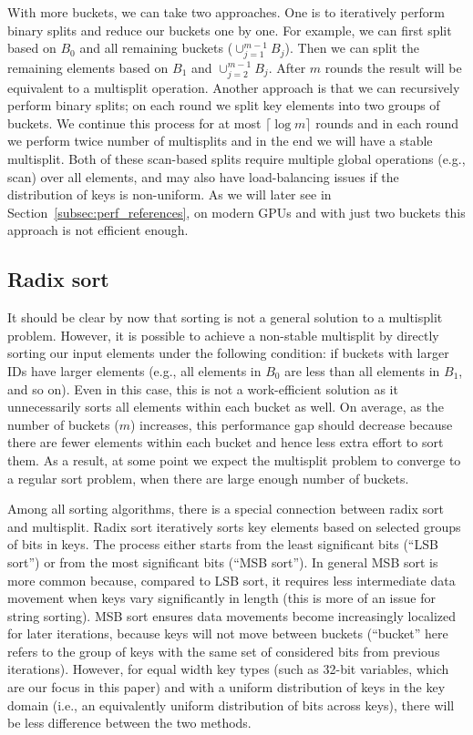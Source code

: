 With more buckets, we can take two approaches.
One is to iteratively perform binary splits and reduce our buckets one by one. For example, we can first split based on $B_0$ and all remaining buckets ($\cup_{j=1}^{m-1} B_j$). Then we can split the remaining elements based on $B_1$ and $\cup_{j=2}^{m-1} B_j$. After $m$ rounds the result will be equivalent to a multisplit operation.
Another approach is that we can recursively perform binary splits; on each round we split key elements into two groups of buckets.
We continue this process for at most $\lceil \log m\rceil$ rounds and in each round we perform twice number of multisplits and in the end we will have a stable multisplit.
Both of these scan-based splits require multiple global operations (e.g., scan) over all elements, and may also have load-balancing issues if the distribution of keys is non-uniform.
As we will later see in Section~\ref{subsec:perf_references}, on modern GPUs and with just two buckets this approach is not efficient enough.

\subsection{Radix sort}\label{sec:radix}
It should be clear by now that sorting is not a general solution to a multisplit problem.
However, it is possible to achieve a non-stable multisplit by directly sorting our input elements under the following condition: if buckets with larger IDs have larger elements (e.g., all elements in $B_0$ are less than all elements in $B_1$, and so on).
Even in this case, this is not a work-efficient solution as it unnecessarily sorts all elements within each bucket as well.
On average, as the number of buckets ($m$) increases, this performance gap should decrease because there are fewer elements within each bucket and hence less extra effort to sort them. As a result, at some point we expect the multisplit problem to converge to a regular sort problem, when there are large enough number of buckets.

Among all sorting algorithms, there is a special connection between radix sort and multisplit.
Radix sort iteratively sorts key elements based on selected groups of bits in keys. The process either starts from the least significant bits (``LSB sort'') or from the most significant bits (``MSB sort'').
In general MSB sort is more common because, compared to LSB sort, it requires less intermediate data movement when keys vary significantly in length (this is more of an issue for string sorting).
MSB sort ensures data movements become increasingly localized for later  iterations, because keys will not move between buckets (``bucket'' here refers to the group of keys with the same set of considered bits from previous iterations).
However, for equal width key types (such as 32-bit variables, which are our focus in this paper) and with a uniform distribution of keys in the key domain (i.e., an equivalently uniform distribution of bits across keys), there will be less difference between the two methods.

